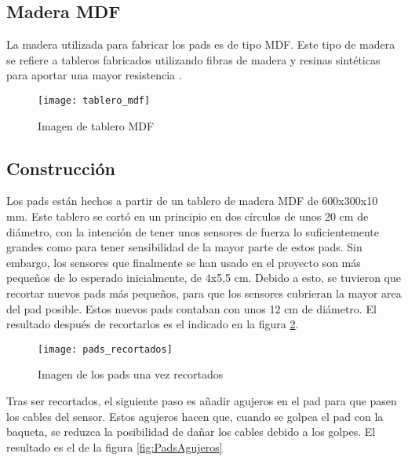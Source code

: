         \subsection{Madera MDF} %
        \label{sub:MaderaMDF}

            La madera utilizada para fabricar los pads es de tipo MDF. Este tipo de madera se refiere a tableros
            fabricados utilizando fibras de madera y resinas sintéticas para aportar una mayor
            resistencia \cite{mdf_santana}.

            \newpage

            \begin{figure}[ht]
                \centering
                \texttt{[image: tablero\_mdf]}
                \caption{Imagen de tablero MDF\label{fig:TableroMDF}}
            \end{figure}


        \subsection{Construcción} %
        \label{sub:ConstruccionPads}

            Los pads están hechos a partir de un tablero de madera MDF de 600x300x10 mm. Este tablero se cortó en un
            principio en dos círculos de unos 20 cm de diámetro, con la intención de tener unos sensores de fuerza lo
            suficientemente grandes como para tener sensibilidad de la mayor parte de estos pads. Sin embargo, los
            sensores que finalmente se han usado en el proyecto son más pequeños de lo esperado inicialmente, de
            4x5,5 cm. Debido a esto, se tuvieron que recortar nuevos pads más pequeños, para que los sensores cubrieran
            la mayor area del pad posible. Estos nuevos pads contaban con unos 12 cm de diámetro. El resultado después
            de recortarlos es el indicado en la figura \ref{fig:PadsRecortados}.

            \begin{figure}[ht]
                \centering
                \texttt{[image: pads\_recortados]}
                \caption{Imagen de los pads una vez recortados\label{fig:PadsRecortados}}
            \end{figure}

            \newpage

            Tras ser recortados, el siguiente paso es añadir agujeros en el pad para que pasen los cables del sensor.
            Estos agujeros hacen que, cuando se golpea el pad con la baqueta, se reduzca la posibilidad de dañar los
            cables debido a los golpes. El resultado es el de la figura \ref{fig:PadsAgujeros}


